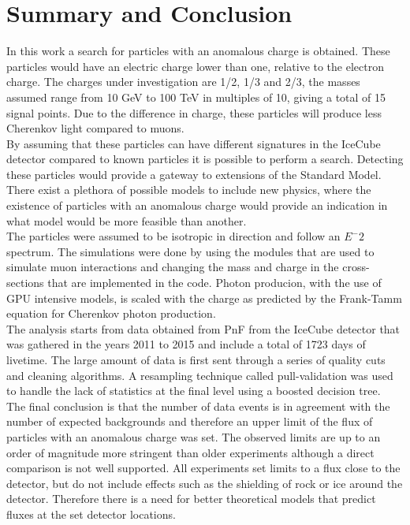\chapter{Summary and Conclusion}
\label{ch:summary}
In this work a search for particles with an anomalous charge is obtained. These particles would have an electric charge lower than one, relative to the electron charge. The charges under investigation are 1/2, 1/3 and 2/3, the masses assumed range from 10 GeV to 100 TeV in multiples of 10, giving a total of 15 signal points. Due to the difference in charge, these particles will produce less Cherenkov light compared to muons.\\

\noindent By assuming that these particles can have different signatures in the IceCube detector compared to known particles it is possible to perform a search. Detecting these particles would provide a gateway to extensions of the Standard Model. There exist a plethora of possible models to include new physics, where the existence of particles with an anomalous charge would provide an indication in what model would be more feasible than another.\\

\noindent The particles were assumed to be isotropic in direction and follow an $E^-2$ spectrum. The simulations were done by using the modules that are used to simulate muon interactions and changing the mass and charge in the cross-sections that are implemented in the code. Photon producion, with the use of GPU intensive models, is scaled with the charge as predicted by the Frank-Tamm equation for Cherenkov photon production.\\

\noindent The analysis starts from data obtained from PnF from the IceCube detector that was gathered in the years 2011 to 2015 and include a total of 1723 days of livetime. The large amount of data is first sent through a series of quality cuts and cleaning algorithms. A resampling technique called pull-validation was used to handle the lack of statistics at the final level using a boosted decision tree.\\

\noindent The final conclusion is that the number of data events is in agreement with the number of expected backgrounds and therefore an upper limit of the flux of particles with an anomalous charge was set. The observed limits are up to an order of magnitude more stringent than older experiments although a direct comparison is not well supported. All experiments set limits to a flux close to the detector, but do not include effects such as the shielding of rock or ice around the detector. Therefore there is a need for better theoretical models that predict fluxes at the set detector locations.\\

